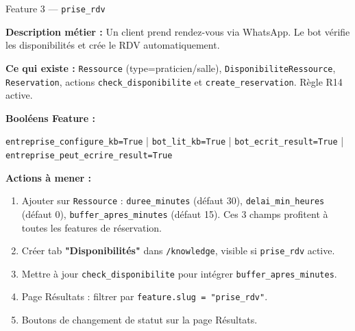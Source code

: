 \documentclass[11pt,a4paper]{article}
\newcommand{\slug}[1]{\texttt{\color{AGTDark}#1}}
\begin{document}
\begin{featurebox}{Feature 3 — \slug{prise\_rdv}}

\textbf{Description métier :} Un client prend rendez-vous via WhatsApp. Le bot
vérifie les disponibilités et crée le RDV automatiquement.

\textbf{Ce qui existe :} \slug{Ressource} (type=praticien/salle),
\slug{DisponibiliteRessource}, \slug{Reservation}, actions
\slug{check\_disponibilite} et \slug{create\_reservation}. Règle R14 active.

\medskip
\textbf{Booléens Feature :}
\begin{decisionbox}
\texttt{entreprise\_configure\_kb=True} | \texttt{bot\_lit\_kb=True} |
\texttt{bot\_ecrit\_result=True} | \texttt{entreprise\_peut\_ecrire\_result=True}
\end{decisionbox}

\medskip
\textbf{Actions à mener :}
\begin{enumerate}
  \item Ajouter sur \slug{Ressource} : \slug{duree\_minutes} (défaut 30),
        \slug{delai\_min\_heures} (défaut 0), \slug{buffer\_apres\_minutes} (défaut 15).
        Ces 3 champs profitent à toutes les features de réservation.
  \item Créer tab \textbf{"Disponibilités"} dans \texttt{/knowledge},
        visible si \slug{prise\_rdv} active.
  \item Mettre à jour \slug{check\_disponibilite} pour intégrer
        \slug{buffer\_apres\_minutes}.
  \item Page Résultats : filtrer par \texttt{feature.slug = "prise\_rdv"}.
  \item Boutons de changement de statut sur la page Résultats.
\end{enumerate}

\end{featurebox}

\bigskip
\end{document}
